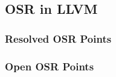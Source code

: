 \subsection{OSR in LLVM}
\label{se:osr-llvm}

\subsubsection{Resolved OSR Points}

\subsubsection{Open OSR Points}
  
  
  
  